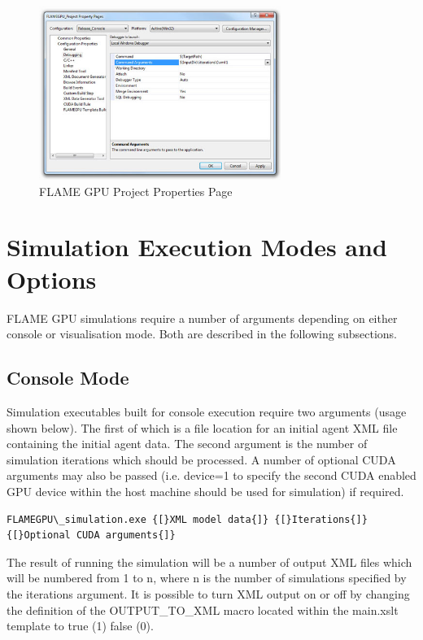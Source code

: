 \documentclass[11pt, a4paper, onecolumn, oneside]{report}
\begin{document}
\begin{figure}[ht]
    \centering
    \includegraphics[width=0.70\textwidth]{img/figure3}
    \caption{FLAME GPU Project Properties Page}
    \label{fig:project-properties-page}
\end{figure} 

\section{Simulation Execution Modes and Options}
\label{sec:45}


FLAME GPU simulations require a number of arguments depending on either console or visualisation mode. Both are described in the following subsections.


\subsection{Console Mode}
\label{sec:451}


Simulation executables built for console execution require two arguments (usage shown below).
The first of which is a file location for an initial agent XML file containing the initial agent data.
The second argument is the number of simulation iterations which should be processed.
A number of optional CUDA arguments may also be passed (i.e.
device=1 to specify the second CUDA enabled GPU device within the host machine should be used for simulation) if required.

\begin{verbatim}
FLAMEGPU\_simulation.exe {[}XML model data{]} {[}Iterations{]} {[}Optional CUDA arguments{]}
\end{verbatim}

The result of running the simulation will be a number of output XML files which will be numbered from 1 to n, where n is the number of simulations specified by the iterations argument.
It is possible to turn XML output on or off by changing the definition of the OUTPUT\_TO\_XML macro located within the main.xslt template to true (1) false (0).
\end{document}
